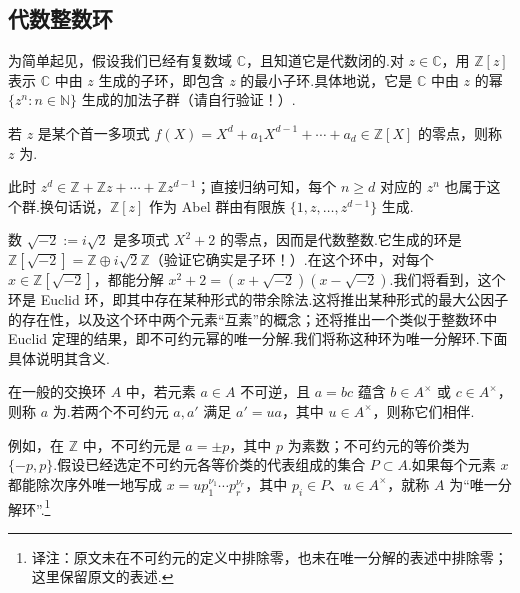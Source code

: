 \subsection{代数整数环}\label{sec:galois-1-1-2}
为简单起见，假设我们已经有复数域 $\mathbb C$，且知道它是代数闭的.对 $z\in\mathbb C$，用 $\mathbb Z[z]$ 表示 $\mathbb C$ 中由 $z$ 生成的子环，即包含 $z$ 的最小子环.具体地说，它是 $\mathbb C$ 中由 $z$ 的幂 $\{z^n:n\in\mathbb N\}$ 生成的加法子群（请自行验证！）.
\begin{definition*}
若 $z$ 是某个首一多项式 $f(X)=X^d+a_1X^{d-1}+\cdots+a_d\in\mathbb Z[X]$ 的零点，则称 $z$ 为.
\end{definition*}
此时 $z^d\in\mathbb Z+\mathbb Zz+\cdots+\mathbb Zz^{d-1}$；直接归纳可知，每个 $n\geq d$ 对应的 $z^n$ 也属于这个群.换句话说，$\mathbb Z[z]$ 作为 Abel 群由有限族 $\{1,z,\ldots,z^{d-1}\}$ 生成.
\begin{example*}[{环 $\mathbb Z[\sqrt{-2}]$ 与方程 $x^2+2=y^3$}]
数 $\sqrt{-2}:=i\sqrt2$ 是多项式 $X^2+2$ 的零点，因而是代数整数.它生成的环是 $\mathbb Z[\sqrt{-2}]=\mathbb Z\oplus i\sqrt2\mathbb Z$（验证它确实是子环！）.在这个环中，对每个 $x\in\mathbb Z[\sqrt{-2}]$，都能分解 $x^2+2=(x+\sqrt{-2})(x-\sqrt{-2})$.我们将看到，这个环是 Euclid 环，即其中存在某种形式的带余除法.这将推出某种形式的最大公因子的存在性，以及这个环中两个元素``互素''的概念；还将推出一个类似于整数环中 Euclid 定理的结果，即不可约元幂的唯一分解.我们将称这种环为唯一分解环.下面具体说明其含义.
\end{example*}
\begin{definition*}
在一般的交换环 $A$ 中，若元素 $a\in A$ 不可逆，且 $a=bc$ 蕴含 $b\in A^\times$ 或 $c\in A^\times$，则称 $a$ 为.若两个不可约元 $a,a'$ 满足 $a'=ua$，其中 $u\in A^\times$，则称它们相伴.
\end{definition*}
例如，在 $\mathbb Z$ 中，不可约元是 $a=\pm p$，其中 $p$ 为素数；不可约元的等价类为 $\{-p,p\}$.假设已经选定不可约元各等价类的代表组成的集合 $P\subset A$.如果每个元素 $x$ 都能除次序外唯一地写成 $x=up_1^{\nu_1}\cdots p_r^{\nu_r}$，其中 $p_i\in P$、$u\in A^\times$，就称 $A$ 为``唯一分解环''.\footnote{译注：原文未在不可约元的定义中排除零，也未在唯一分解的表述中排除零；这里保留原文的表述.}

